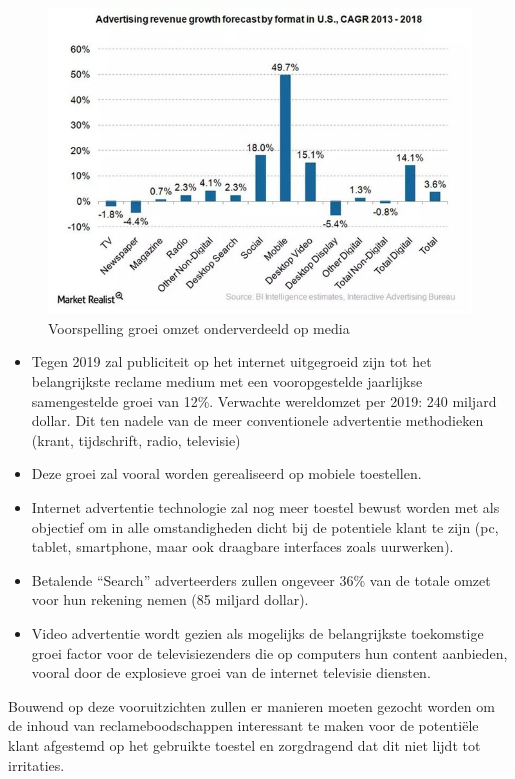 \documentclass[pdftex,a4paper,12pt,twoside]{report}
\begin{document}
\begin{figure}[h!]
\centering
\includegraphics[width=12cm]{img/advRevGrowthFormat}
\caption{Voorspelling groei omzet onderverdeeld op media}
\label{fig: Advertising revenue growth forecast by format}
\end{figure} 

\begin{itemize}
	\item 	Tegen 2019 zal publiciteit op het internet uitgegroeid zijn tot het belangrijkste reclame medium met een vooropgestelde jaarlijkse samengestelde groei van 	12\%. Verwachte wereldomzet per 2019: 240 miljard dollar. Dit ten nadele van de meer conventionele advertentie methodieken (krant, tijdschrift, radio, televisie)
	
	\item	Deze groei zal vooral worden gerealiseerd op mobiele toestellen.
	\item	Internet advertentie technologie zal nog meer toestel bewust worden met als objectief om in alle omstandigheden dicht bij de potentiele klant te zijn (pc, tablet, smartphone, maar ook draagbare interfaces zoals uurwerken).
	\item	Betalende “Search” adverteerders zullen ongeveer 36\% van de totale omzet voor hun rekening nemen (85 miljard dollar).
	\item	Video advertentie wordt gezien als mogelijks de belangrijkste toekomstige groei factor voor de televisiezenders die op computers hun content aanbieden, vooral door de explosieve groei van de internet televisie diensten.
\end{itemize}
Bouwend op deze vooruitzichten zullen er manieren moeten gezocht worden om de inhoud van reclameboodschappen interessant te maken voor de potentiële klant afgestemd op het gebruikte toestel en zorgdragend dat dit niet lijdt tot irritaties. 
\end{document}
